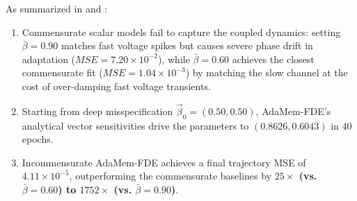 \documentclass[11pt,a4paper]{article}
\theoremstyle{plain}
\theoremstyle{definition}
\begin{document}
\begin{table}[t]
\centering
\small
\caption{Phase X Incommensurate Multi-Order Fractional Dynamics Benchmark.}
\label{tab:phase10_results}
\end{table}

As summarized in  and :
\begin{enumerate}
    \item Commensurate scalar models fail to capture the coupled dynamics: setting $\bar{\beta} = 0.90$ matches fast voltage spikes but causes severe phase drift in adaptation ($MSE = 7.20 \times 10^{-2}$), while $\bar{\beta} = 0.60$ achieves the closest commensurate fit ($MSE = 1.04 \times 10^{-3}$) by matching the slow channel at the cost of over-damping fast voltage transients.
    \item Starting from deep misspecification $\vec{\beta}_0 = (0.50, 0.50)$, AdaMem-FDE's analytical vector sensitivities drive the parameters to $(0.8626, 0.6043)$ in 40 epochs.
    \item Incommensurate AdaMem-FDE achieves a final trajectory MSE of \textbf{$4.11 \times 10^{-5}$}, outperforming the commensurate baselines by \textbf{$25\times$ (vs. $\bar{\beta} = 0.60$) to $1752\times$ (vs. $\bar{\beta} = 0.90$)}.
\end{enumerate}

\end{document}
